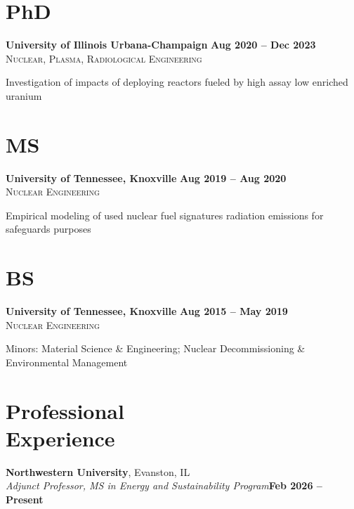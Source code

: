 \documentclass[margin,line]{resume}
\begin{document}
\begin{resume}
    \section{\mysidestyle PhD}
    \textbf{University of Illinois Urbana-Champaign} \hfill \textbf{Aug 2020 -- Dec 2023}\\%
    \textsc{Nuclear, Plasma, Radiological Engineering}\hfill
    \begin{list2}
        \item Investigation of impacts of deploying reactors fueled by high 
        assay low enriched uranium
    \end{list2}\vspace{-4mm}
    
    \section{\mysidestyle MS}
    \textbf{University of Tennessee, Knoxville} \hfill\textbf{Aug 2019 -- Aug 2020}\\%
    \textsc{Nuclear Engineering}\hfill
    \begin{list2}
        \item Empirical modeling of used nuclear fuel signatures radiation emissions for safeguards purposes
    \end{list2}\vspace{-4mm}
    \section{\mysidestyle BS}
    \textbf{University of Tennessee, Knoxville} \hfill\textbf{Aug 2015 -- May 2019}\\%
    \textsc{Nuclear Engineering}\hfill
    \begin{list2}
        \item Minors: Material Science \& Engineering; Nuclear Decommissioning \& 
              Environmental Management
    \end{list2}\vspace{-5mm}
    
    \section{\mysidestyle Professional\\Experience}
    \textbf{Northwestern University}, Evanston, IL\\
    \vspace{-2mm}
        \textsl{Adjunct Professor, MS in Energy and Sustainability Program}\hfill\textbf{Feb 2026 -- Present}\\\vspace{-7mm}


\end{resume}
\end{document}
